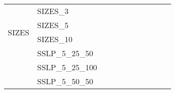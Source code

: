 \begin{table}[]
{\begin{tabular}{|c|l|ll|ll|ll|l|l|l|}
\hline
			\multirow{4}{*}{SIZES}  & SIZES\_3                      &                                   &                                  &                           &                          &                           &                          &                                       &         &                       \\
			& SIZES\_5                      &                                   &                                  &                           &                          &                           &                          &                                       &                               & \\
			& SIZES\_10                     &                                   &                                  &                           &                          &                           &                          &                                       &                               & \\
\hline
			\multirow{8}{*}{SSLP}  & SSLP\_5\_25\_50               &                                   &                                  &                           &                          &                           &                          &                                       &                               & \\
			& SSLP\_5\_25\_100              &                                   &                                  &                           &                          &                           &                          &                                       &                               & \\
			& SSLP\_5\_50\_50               &                                   &                                  &                           &                          &                           &                          &                                       &                               & \\

\end{tabular}}
\end{table}
